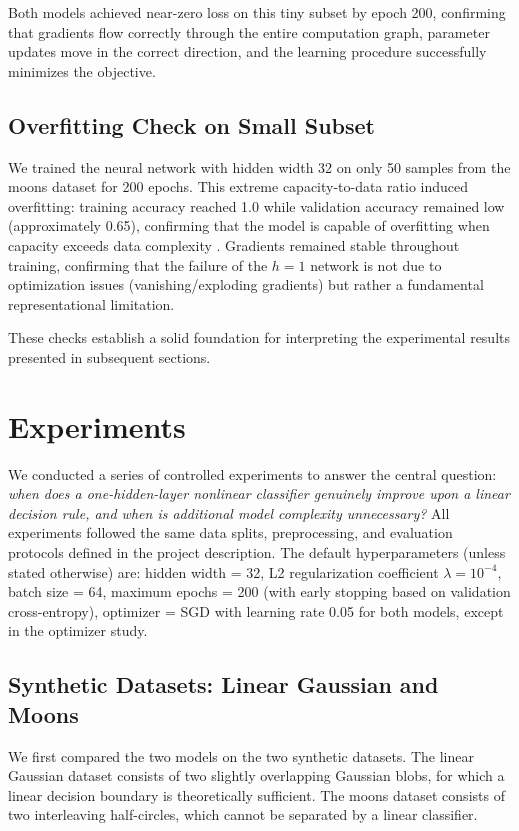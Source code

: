 \documentclass[sigconf,screen,nonacm,nofonts]{acmart}
\begin{document}
Both models achieved near-zero loss on this tiny subset by epoch 200, confirming that gradients flow correctly through the entire computation graph, parameter updates move in the correct direction, and the learning procedure successfully minimizes the objective.

\subsection{Overfitting Check on Small Subset}

We trained the neural network with hidden width 32 on only 50 samples from the moons dataset for 200 epochs. This extreme capacity-to-data ratio induced overfitting: training accuracy reached 1.0 while validation accuracy remained low (approximately 0.65), confirming that the model is capable of overfitting when capacity exceeds data complexity \cite{goodfellow2016deep}. Gradients remained stable throughout training, confirming that the failure of the \(h=1\) network is not due to optimization issues (vanishing/exploding gradients) but rather a fundamental representational limitation.

These checks establish a solid foundation for interpreting the experimental results presented in subsequent sections.

\section{Experiments}

We conducted a series of controlled experiments to answer the central question: \emph{when does a one-hidden-layer nonlinear classifier genuinely improve upon a linear decision rule, and when is additional model complexity unnecessary?} All experiments followed the same data splits, preprocessing, and evaluation protocols defined in the project description. The default hyperparameters (unless stated otherwise) are: hidden width = 32, L2 regularization coefficient \(\lambda = 10^{-4}\), batch size = 64, maximum epochs = 200 (with early stopping based on validation cross-entropy), optimizer = SGD with learning rate 0.05 for both models, except in the optimizer study.

\subsection{Synthetic Datasets: Linear Gaussian and Moons}

We first compared the two models on the two synthetic datasets. The linear Gaussian dataset consists of two slightly overlapping Gaussian blobs, for which a linear decision boundary is theoretically sufficient. The moons dataset consists of two interleaving half-circles, which cannot be separated by a linear classifier.
\end{document}
